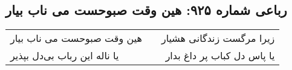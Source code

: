 \begin{center}
\section*{رباعی شماره ۹۲۵: هین وقت صبوحست می ناب بیار}
\label{sec:0925}
\begin{longtable}{l p{0.5cm} r}
هین وقت صبوحست می ناب بیار
&&
زیرا مرگست زندگانی هشیار
\\
یا ناله این رباب بی‌دل بپذیر
&&
یا پاس دل کباب پر داغ بدار
\\
\end{longtable}
\end{center}
